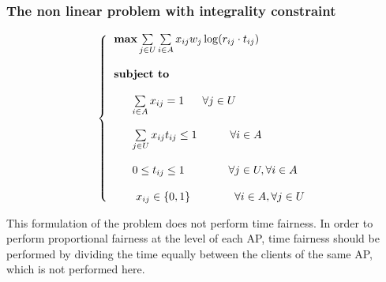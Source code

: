 \documentclass[journal,transmag]{IEEEtran}
\begin{document}
\subsubsection{The non linear problem with integrality constraint}
\begin{footnotesize}
\begin{equation}
\left\{
\begin{tabular}{l} 
$\textbf{max}  \sum\limits_{j \in U} \sum\limits_{i \in A} x_{ij} w_j \log (r_{ij} \cdot t_{ij}) $ \\         
\\
\textbf{subject to} \\

\\
~~~~~$ \sum\limits_{i \in A} x_{ij} = 1 $ ~~~ $\forall j \in U $  \\

\\
~~~~~$ \sum\limits_{j \in U} x_{ij} t_{ij} \leq 1 ~~~~~~~~~ \forall i \in A $ \\ 

\\
~~~~~$ 0\leq t_{ij} \leq 1   ~~~~~~~~~~~~ \forall j \in U, \forall i \in A  $ \\

\\
~~~~~ $x_{ij} \in \{0,1\} ~~~~~~~~~~~~ \forall i \in A, \forall j \in U $ \\

\end{tabular}
\right.
\end{equation}
\end{footnotesize}  

This formulation of the problem does not perform time fairness. In order to perform proportional fairness at the level of each AP, time fairness should be performed by dividing the time equally between the clients of the same AP, which is not performed here.   
\end{document}
